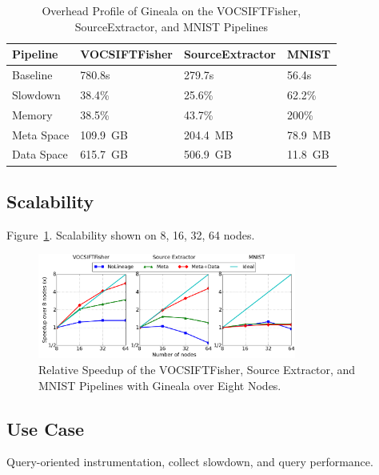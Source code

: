 \documentclass{sig-alternate}
\begin{document}
\begin{table}[ht]
\begin{center}
    \caption{Overhead Profile of Gineala on the VOCSIFTFisher, SourceExtractor, and MNIST Pipelines}
    \begin{scriptsize}
    \begin{tabular}{ | p{1.5cm} | p{2cm} | p{2cm} | p{1.5cm} | }
    \hline
    Pipeline & VOCSIFTFisher & SourceExtractor & MNIST  \\ \hline \hline
    Baseline & 780.8s & 279.7s & 56.4s \\ \hline
    Slowdown & 38.4\% & 25.6\% & 62.2\%   \\ \hline
    Memory & 38.5\% & 43.7\% & 200\%\\ \hline
    Meta Space & 109.9~GB & 204.4~MB & 78.9~MB \\ \hline
    Data Space & 615.7~GB & 506.9~GB & 11.8~GB\\ \hline
    \end{tabular}
    \end{scriptsize}
    \label{tb:apps-overhead}
\end{center}   
\end{table}

\subsection{Scalability}
Figure~\ref{fig:scalability}. Scalability shown on 8, 16, 32, 64 nodes.

\begin{figure}[h]
\begin{center}
    \includegraphics[width=85mm]{pictures/Scalability}
\caption {Relative Speedup of the VOCSIFTFisher, Source Extractor, and MNIST Pipelines with Gineala over Eight Nodes.
    \label{fig:scalability}
}
\end{center}
\end{figure}

\subsection{Use Case}
Query-oriented instrumentation, collect slowdown, and query performance.
\end{document}

